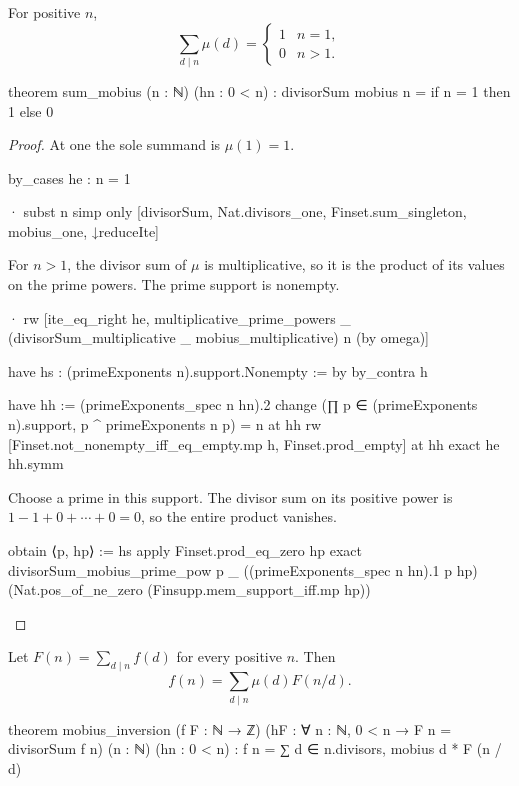 \begin{theorem}
  \label{ent:thm:sum-mobius}
  For positive $n$, \[ \sum_{d\mid n}\mu(d)=
    \begin{cases}
      1 & n=1, \\0&n>1.
    \end{cases} \]

  \begin{lean}
    theorem sum_mobius (n : ℕ) (hn : 0 < n) :
        divisorSum mobius n = if n = 1 then 1 else 0
  \end{lean}
\end{theorem}

\begin{proof}
  At one the sole summand is $\mu(1)=1$.

  \begin{lean}
    by_cases he : n = 1

    · subst n
      simp only [divisorSum, Nat.divisors_one, Finset.sum_singleton, mobius_one, ↓reduceIte]
  \end{lean}

  For $n>1$, the divisor sum of $\mu$ is multiplicative, so it is the product of its values on the
  prime powers.
  The prime support is nonempty.

  \begin{lean}
    · rw [ite_eq_right he, multiplicative_prime_powers _
        (divisorSum_multiplicative _ mobius_multiplicative) n (by omega)]

      have hs : (primeExponents n).support.Nonempty := by
        by_contra h

        have hh := (primeExponents_spec n hn).2
        change (∏ p ∈ (primeExponents n).support, p ^ primeExponents n p) = n at hh
        rw [Finset.not_nonempty_iff_eq_empty.mp h, Finset.prod_empty] at hh
        exact he hh.symm
  \end{lean}

  Choose a prime in this support.
  The divisor sum on its positive power is $1-1+0+\cdots+0=0$, so the entire product vanishes.

  \begin{lean}
    obtain ⟨p, hp⟩ := hs
    apply Finset.prod_eq_zero hp
    exact divisorSum_mobius_prime_pow p _ ((primeExponents_spec n hn).1 p hp)
      (Nat.pos_of_ne_zero (Finsupp.mem_support_iff.mp hp))
  \end{lean}
\end{proof}

\begin{theorem}
  \label{ent:thm:mobius-inversion}
  Let $F(n)=\sum_{d\mid n}f(d)$ for every positive $n$.
  Then \[ f(n)=\sum_{d\mid n}\mu(d)F(n/d). \]

  \begin{lean}
    theorem mobius_inversion (f F : ℕ → ℤ)
        (hF : ∀ n : ℕ, 0 < n → F n = divisorSum f n) (n : ℕ) (hn : 0 < n) :
        f n = ∑ d ∈ n.divisors, mobius d * F (n / d)
  \end{lean}
\end{theorem}

